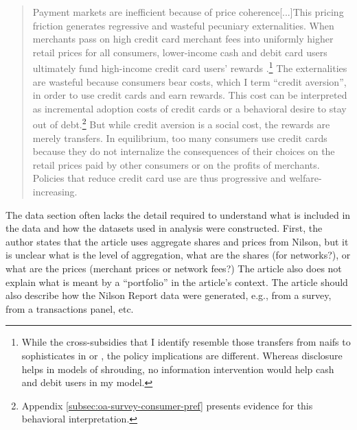 \documentclass[main.tex]{subfiles}
\begin{document}
\begin{refsection}
\begin{quotation}
    Payment markets are inefficient because of price coherence[...]This pricing friction generates regressive and wasteful pecuniary externalities.
    When merchants pass on high credit card merchant fees into uniformly higher retail prices for all consumers, lower-income cash and debit card users ultimately fund high-income credit card users' rewards \parencite{Felt.etal2020}.\footnote{While the cross-subsidies that I identify resemble those transfers from naifs to sophisticates in \textcite{Gabaix.Laibson2006} or \textcite{Agarwal.etal2022}, the policy implications are different. Whereas disclosure helps in models of shrouding, no information intervention would help cash and debit users in my model.}
    The externalities are wasteful because consumers bear costs, which I term ``credit aversion'', in order to use credit cards and earn rewards.
    This cost can be interpreted as incremental adoption costs of credit cards or a behavioral desire to stay out of debt.\footnote{Appendix \ref{subsec:oa-survey-consumer-pref} presents evidence for this behavioral interpretation.}
    But while credit aversion is a social cost, the rewards are merely transfers.
    In equilibrium, too many consumers use credit cards because they do not internalize the consequences of their choices on the retail prices paid by other consumers or on the profits of merchants.
    Policies that reduce credit card use are thus progressive and welfare-increasing.
\end{quotation}

\begin{refcomment}
The data section often lacks the detail required to understand what is included in the data and how the datasets used in analysis were constructed.
First, the author states that the article uses aggregate shares and prices from Nilson, but it is unclear what is the level of aggregation, what are the shares (for networks?), or what are the prices (merchant prices or network fees?) The article also does not explain what is meant by a “portfolio” in the article's context.
The article should also describe how the Nilson Report data were generated, e.g., from a survey, from a transactions panel, etc.
\end{refcomment}


\end{refsection}
\end{document}
